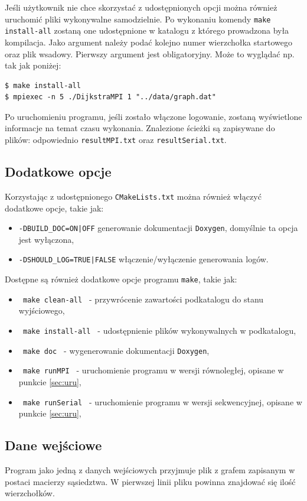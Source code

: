 \documentclass[12pt]{article}
\begin{document}
Jeśli użytkownik nie chce skorzystać z udostępnionych opcji można również uruchomić pliki wykonywalne samodzielnie. Po wykonaniu komendy \lstinline|make install-all| zostaną one udostępnione w katalogu z którego prowadzona była kompilacja. Jako argument należy podać kolejno numer wierzchołka startowego oraz plik wsadowy. Pierwszy argument jest obligatoryjny. Może to wyglądać np. tak jak poniżej:

\begin{lstlisting}
$ make install-all
$ mpiexec -n 5 ./DijkstraMPI 1 "../data/graph.dat"
\end{lstlisting}

Po uruchomieniu programu, jeśli zostało włączone logowanie, zostaną wyświetlone informacje na temat czasu wykonania. Znalezione ścieżki są zapisywane do plików: odpowiednio \lstinline|resultMPI.txt| oraz \lstinline|resultSerial.txt|.

\subsection{Dodatkowe opcje}
Korzystając z udostępnionego \lstinline|CMakeLists.txt| można również włączyć dodatkowe opcje, takie jak:
\begin{itemize}
\item \lstinline+-DBUILD_DOC=ON|OFF+ generowanie dokumentacji \lstinline|Doxygen|, domyślnie ta opcja jest wyłączona,
\item \lstinline+-DSHOULD_LOG=TRUE|FALSE+ włączenie/wyłączenie generowania logów.
\end{itemize}

\noindent
Dostępne są również dodatkowe opcje programu \lstinline|make|, takie jak:
\begin{itemize}
\item \lstinline| make clean-all | - przywrócenie zawartości podkatalogu do stanu wyjściowego,
\item \lstinline| make install-all | - udostępnienie plików wykonywalnych w podkatalogu,
\item \lstinline| make doc |  - wygenerowanie dokumentacji \lstinline|Doxygen|,
\item \lstinline| make runMPI |  - uruchomienie programu w wersji równoległej, opisane w punkcie \ref{sec:uru},
\item \lstinline| make runSerial |  - uruchomienie programu w wersji sekwencyjnej, opisane w punkcie  \ref{sec:uru},
\end{itemize}

\subsection{Dane wejściowe}
Program jako jedną z danych wejściowych przyjmuje plik z grafem zapisanym w postaci macierzy sąsiedztwa.
W pierwszej linii pliku powinna znajdować się ilość wierzchołków.
\end{document}
